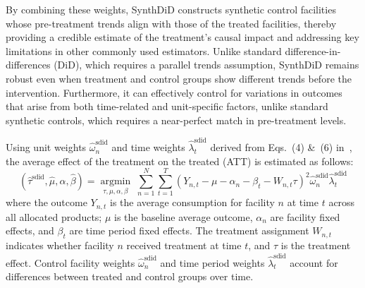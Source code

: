 \documentclass[12pt]{article}
\begin{document}
By combining these weights, SynthDiD constructs synthetic control facilities whose pre-treatment trends align with those of the treated facilities, thereby providing a credible estimate of the treatment’s causal impact and addressing key limitations in other commonly used estimators. Unlike standard difference-in-differences (DiD), which requires a parallel trends assumption, SynthDiD remains robust even when treatment and control groups show different trends before the intervention. Furthermore, it can effectively control for variations in outcomes that arise from both time-related and unit-specific factors, unlike standard synthetic controls, which requires a near-perfect match in pre-treatment levels.

Using unit weights $\hat{\omega}_n^{\text{sdid}}$ and time weights $\hat{\lambda}_t^{\text{sdid}}$ derived from Eqs.~(4) \&~(6) in~\cite{arkhangelsky2021synthetic}, the average effect of the treatment on the treated (ATT) is estimated as follows:
\begin{equation}
\left( \hat{\tau}^{\text{sdid}}, \hat{\mu}, \hat{\alpha}, \hat{\beta} \right) =
\underset{\tau, \mu, \alpha, \beta}{\operatorname{argmin}} \;
\sum_{n=1}^N \sum_{t=1}^T
\left( Y_{n,t} - \mu - \alpha_n - \beta_t - W_{n,t} \tau \right)^2
\hat{\omega}_n^{\text{sdid}} \hat{\lambda}_t^{\text{sdid}}
\end{equation}
where the outcome $Y_{n,t}$ is the average consumption for facility $n$ at time $t$ across all allocated products; $\mu$ is the baseline average outcome, $\alpha_n$ are facility fixed effects, and $\beta_t$ are time period fixed effects. The treatment assignment $W_{n,t}$ indicates whether facility $n$ received treatment at time $t$, and $\tau$ is the treatment effect. Control facility weights $\hat{\omega}_n^{\text{sdid}}$ and time period weights $\hat{\lambda}_t^{\text{sdid}}$ account for differences between treated and control groups over time.
\end{document}
